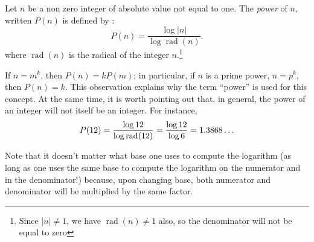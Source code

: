 \documentclass[12pt]{article}
\begin{document}
Let $n$ be a non zero integer of absolute value not equal to one. The \emph{power} of $n$, written $P(n)$ is defined by :
 \[P(n)=\frac{\log{|n|}}{\log{\operatorname{rad}(n)}}.\]
where $\operatorname{rad}(n)$ is the radical of the integer $n$.\footnote{Since $|n| \neq 1$, we have $\operatorname{rad}(n) \neq 1$ also, so the denominator will not be equal to zero}

If $n = m^k$, then $P(n) = k P(m)$; in particular, if $n$ is a prime power, $n = p^k$, then $P(n) = k$.  This observation explains why the term ``power'' is used
for this concept.  At the same time, it is worth pointing out that, in general,
the power of an integer will not itself be an integer.  For instance,
 \[P(12) = {\log 12 \over \log \operatorname{rad} (12)} = {\log 12 \over \log 6} = 1.3868\ldots \]

Note that it doesn't matter what base one uses to compute the logarithm (as long as one uses the same base to compute the logarithm on the numerator and in the denominator!) because, upon changing base, both numerator and denominator will be multiplied by the same factor.

\end{document}
